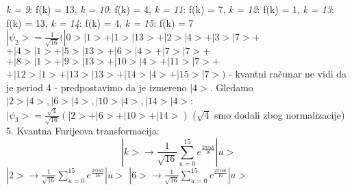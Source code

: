 \documentclass{article}
\begin{document}
\begin{tcolorbox}[width=\textwidth,colback={beaublue},outer arc=0mm,colupper=charcoal]
\textit{k = 9}: f(k) = 13, \textit{k = 10}: f(k) = 4, \textit{k = 11}: f(k) = 7, \newline\hspace*{0.8cm}
\textit{k = 12}: f(k) = 1, \textit{k = 13}: f(k) = 13, \textit{k = 14}: f(k) = 4, \newline\hspace*{0.8cm}
\textit{k = 15}: f(k) = 7
\vspace{0.2cm}\newline\hspace*{0.4cm}
$|\psi_2> = \frac{1}{\sqrt{16}}(|0>|1> + |1>|13> + |2>|4> + |3>|7> + $ \newline\hspace*{2.1cm}
$+ |4>|1> + |5>|13> + |6>|4> + |7>|7> +$
\newline\hspace*{2.1cm}
$+ |8>|1> + |9>|13> + |10>|4> + |11>|7> +$
\newline\hspace*{2.1cm}
$+ |12>|1> + |13>|13> + |14>|4> + |15>|7>)$
\vspace{0.2cm}\newline\hspace*{0.4cm}
- kvantni računar ne vidi da je period 4 \newline\hspace*{0.4cm}
- predpostavimo da je izmereno $|4>$. \newline\hspace*{0.6cm}
Gledamo $|2>|4>, |6>|4>, |10>|4>, |14>|4>$: \newline\hspace*{0.7cm}
$|\psi_3> = \frac{\sqrt{4}}{\sqrt{16}}(|2>+|6>+|10>+|14>)$ ($\sqrt{4}$ smo dodali \newline\hspace*{2.2cm}zbog normalizacije)
\vspace{0.2cm}\newline\hspace*{0.4cm}
5. Kvantna Furijeova transformacija:
$$|k> \longrightarrow \frac{1}{\sqrt{16}}\sum_{u=0}^{15}e^\frac{2\pi i u k}{16}|u>$$
\newline\hspace*{0.8cm}
$|2> \longrightarrow \frac{1}{\sqrt{16}}\sum_{u=0}^{15}e^\frac{2\pi i u 2}{16}|u>$
\newline\hspace*{0.8cm}
$|6> \longrightarrow \frac{1}{\sqrt{16}}\sum_{u=0}^{15}e^\frac{2\pi i u 6}{16}|u>$
\newline\hspace*{0.8cm}

\end{tcolorbox}
\end{document}
